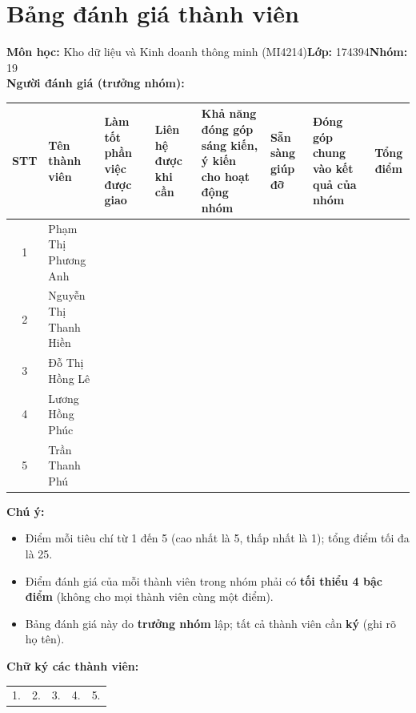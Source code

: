 \chapter*{Bảng đánh giá thành viên}
\noindent\textbf{Môn học:} Kho dữ liệu và Kinh doanh thông minh (MI4214)\qquad\textbf{Lớp:} 174394\qquad\textbf{Nhóm:} 19\\[4pt]
\noindent\textbf{Người đánh giá (trưởng nhóm):} \dotfill

\medskip
\begin{center}
\small
\renewcommand{\arraystretch}{1.25}
\begin{tabularx}{\textwidth}{|c|>{\raggedright\arraybackslash}p{2.8cm}|>{\centering\arraybackslash}X|>{\centering\arraybackslash}X|>{\centering\arraybackslash}X|>{\centering\arraybackslash}X|>{\centering\arraybackslash}X|c|}
\hline
\textbf{STT} & \textbf{Tên thành viên} & \textbf{Làm tốt phần việc được giao} & \textbf{Liên hệ được khi cần} & \textbf{Khả năng đóng góp sáng kiến, ý kiến cho hoạt động nhóm} & \textbf{Sẵn sàng giúp đỡ} & \textbf{Đóng góp chung vào kết quả của nhóm} & \textbf{Tổng điểm}\\
\hline
1 & Phạm Thị Phương Anh & & & & & & \\ \hline
2 & Nguyễn Thị Thanh Hiền & & & & & & \\ \hline
3 & Đỗ Thị Hồng Lê & & & & & & \\ \hline
4 & Lương Hồng Phúc & & & & & & \\ \hline
5 & Trần Thanh Phú & & & & & & \\ \hline
\end{tabularx}
\end{center}

\noindent\textbf{Chú ý:}
\begin{itemize}
  \item Điểm mỗi tiêu chí từ 1 đến 5 (cao nhất là 5, thấp nhất là 1); tổng điểm tối đa là 25.
  \item Điểm đánh giá của mỗi thành viên trong nhóm phải có \textbf{tối thiểu 4 bậc điểm} (không cho mọi thành viên cùng một điểm).
  \item Bảng đánh giá này do \textbf{trưởng nhóm} lập; tất cả thành viên cần \textbf{ký} (ghi rõ họ tên).
\end{itemize}

\bigskip
\noindent\textbf{Chữ ký các thành viên:}\\[1.2cm]
\begin{tabular}{p{2.8cm}p{2.8cm}p{2.8cm}p{2.8cm}p{2.8cm}}
1. \dotfill & 2. \dotfill & 3. \dotfill & 4. \dotfill & 5. \dotfill
\end{tabular}
